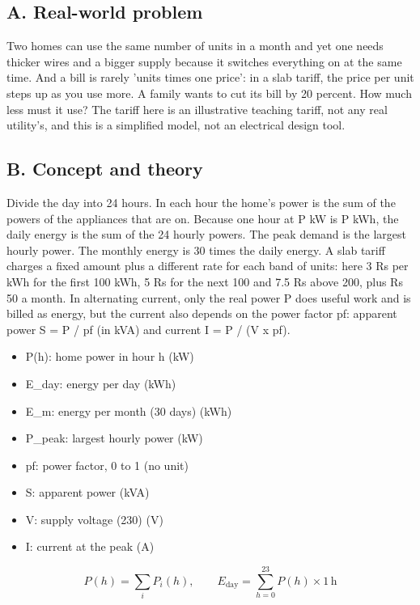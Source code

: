 \documentclass[11pt,a4paper]{article}
\begin{document}
\subsection*{A. Real-world problem}
Two homes can use the same number of units in a month and yet one needs thicker wires and a bigger supply because it switches everything on at the same time. And a bill is rarely 'units times one price': in a slab tariff, the price per unit steps up as you use more. A family wants to cut its bill by 20 percent. How much less must it use? The tariff here is an illustrative teaching tariff, not any real utility's, and this is a simplified model, not an electrical design tool.

\subsection*{B. Concept and theory}
Divide the day into 24 hours. In each hour the home's power is the sum of the powers of the appliances that are on. Because one hour at P kW is P kWh, the daily energy is the sum of the 24 hourly powers. The peak demand is the largest hourly power. The monthly energy is 30 times the daily energy. A slab tariff charges a fixed amount plus a different rate for each band of units: here 3 Rs per kWh for the first 100 kWh, 5 Rs for the next 100 and 7.5 Rs above 200, plus Rs 50 a month. In alternating current, only the real power P does useful work and is billed as energy, but the current also depends on the power factor pf: apparent power S = P / pf (in kVA) and current I = P / (V x pf).

\begin{itemize}[nosep]
\item P(h): home power in hour h (kW)
\item E\_day: energy per day (kWh)
\item E\_m: energy per month (30 days) (kWh)
\item P\_peak: largest hourly power (kW)
\item pf: power factor, 0 to 1 (no unit)
\item S: apparent power (kVA)
\item V: supply voltage (230) (V)
\item I: current at the peak (A)
\end{itemize}

\begin{equation*}
P(h)=\sum_{i} P_i(h),\qquad E_{\mathrm{day}}=\sum_{h=0}^{23} P(h)\times 1\,\mathrm{h}
\end{equation*}
\end{document}
